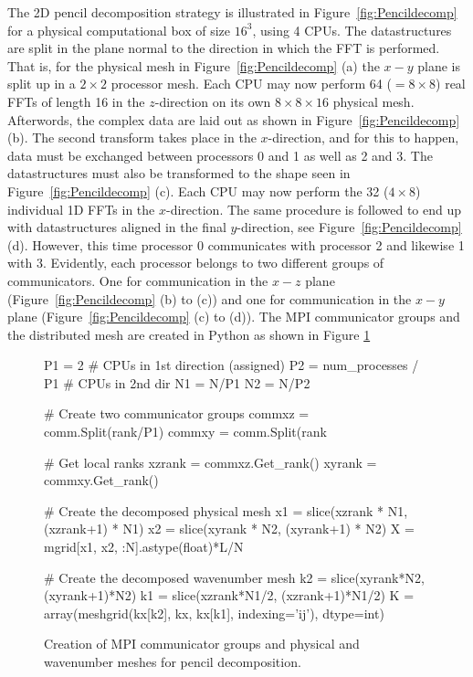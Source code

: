 \documentclass[final,3p,times,twocolumn]{elsarticle}
\begin{document}
The 2D pencil decomposition strategy is illustrated in 
Figure~\ref{fig:Pencildecomp} for a physical computational box of size $16^3$, 
using 4 CPUs. The datastructures are split in the plane normal to the direction 
in which the FFT is performed. That is, for the physical mesh in 
Figure~\ref{fig:Pencildecomp} (a) the $x-y$ plane is split up in a $2\times2$ 
processor mesh. Each CPU may now perform 64 ($= 8 \times 8$) real FFTs of 
length 16 in the $z$-direction on its own $8 \times 8 \times 16$ physical mesh. 
Afterwords, the complex data are laid out as shown in 
Figure~\ref{fig:Pencildecomp} (b). The second transform takes place in the 
$x$-direction, and for this to happen, data must be exchanged between 
processors 0 and 1 as well as 2 and 3. The datastructures must also be 
transformed to the shape seen in Figure~\ref{fig:Pencildecomp} (c). Each CPU 
may now perform the 32 ($4 \times 8$) individual 1D FFTs in the $x$-direction. 
The same procedure is followed to end up with datastructures aligned in the 
final $y$-direction, see Figure~\ref{fig:Pencildecomp} (d). However, this time 
processor 0 communicates with processor 2 and likewise 1 with 3. Evidently, 
each processor belongs to two different groups of communicators. One for 
communication in the $x-z$ plane (Figure~\ref{fig:Pencildecomp} (b) to (c)) and 
one for communication in the $x-y$ plane (Figure~\ref{fig:Pencildecomp} (c) to 
(d)). The MPI communicator groups and the distributed mesh are created in 
Python as shown in Figure \ref{fig:pencil_init}

\begin{figure}
\begin{python}
P1 = 2  # CPUs in 1st direction (assigned)
P2 = num_processes / P1 # CPUs in 2nd dir
N1 = N/P1
N2 = N/P2

# Create two communicator groups
commxz = comm.Split(rank/P1)
commxy = comm.Split(rank%

# Get local ranks
xzrank = commxz.Get_rank()
xyrank = commxy.Get_rank()

# Create the decomposed physical mesh
x1 = slice(xzrank * N1, (xzrank+1) * N1)
x2 = slice(xyrank * N2, (xyrank+1) * N2)
X = mgrid[x1, x2, :N].astype(float)*L/N

# Create the decomposed wavenumber mesh
k2 = slice(xyrank*N2, (xyrank+1)*N2)
k1 = slice(xzrank*N1/2, (xzrank+1)*N1/2)
K = array(meshgrid(kx[k2], kx, kx[k1], 
          indexing='ij'), dtype=int)
\end{python}
\caption{Creation of MPI communicator groups and physical and wavenumber meshes 
for pencil decomposition.}
\label{fig:pencil_init}
\end{figure}	
\end{document}
